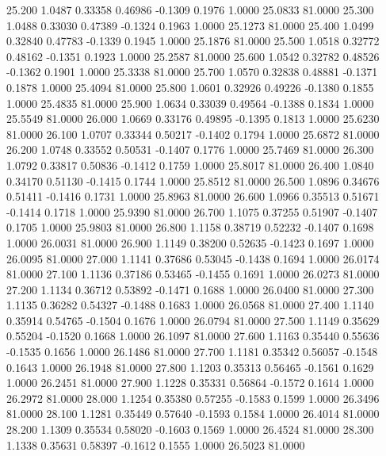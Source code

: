   25.200   1.0487   0.33358   0.46986  -0.1309   0.1976   1.0000  25.0833  81.0000
  25.300   1.0488   0.33030   0.47389  -0.1324   0.1963   1.0000  25.1273  81.0000
  25.400   1.0499   0.32840   0.47783  -0.1339   0.1945   1.0000  25.1876  81.0000
  25.500   1.0518   0.32772   0.48162  -0.1351   0.1923   1.0000  25.2587  81.0000
  25.600   1.0542   0.32782   0.48526  -0.1362   0.1901   1.0000  25.3338  81.0000
  25.700   1.0570   0.32838   0.48881  -0.1371   0.1878   1.0000  25.4094  81.0000
  25.800   1.0601   0.32926   0.49226  -0.1380   0.1855   1.0000  25.4835  81.0000
  25.900   1.0634   0.33039   0.49564  -0.1388   0.1834   1.0000  25.5549  81.0000
  26.000   1.0669   0.33176   0.49895  -0.1395   0.1813   1.0000  25.6230  81.0000
  26.100   1.0707   0.33344   0.50217  -0.1402   0.1794   1.0000  25.6872  81.0000
  26.200   1.0748   0.33552   0.50531  -0.1407   0.1776   1.0000  25.7469  81.0000
  26.300   1.0792   0.33817   0.50836  -0.1412   0.1759   1.0000  25.8017  81.0000
  26.400   1.0840   0.34170   0.51130  -0.1415   0.1744   1.0000  25.8512  81.0000
  26.500   1.0896   0.34676   0.51411  -0.1416   0.1731   1.0000  25.8963  81.0000
  26.600   1.0966   0.35513   0.51671  -0.1414   0.1718   1.0000  25.9390  81.0000
  26.700   1.1075   0.37255   0.51907  -0.1407   0.1705   1.0000  25.9803  81.0000
  26.800   1.1158   0.38719   0.52232  -0.1407   0.1698   1.0000  26.0031  81.0000
  26.900   1.1149   0.38200   0.52635  -0.1423   0.1697   1.0000  26.0095  81.0000
  27.000   1.1141   0.37686   0.53045  -0.1438   0.1694   1.0000  26.0174  81.0000
  27.100   1.1136   0.37186   0.53465  -0.1455   0.1691   1.0000  26.0273  81.0000
  27.200   1.1134   0.36712   0.53892  -0.1471   0.1688   1.0000  26.0400  81.0000
  27.300   1.1135   0.36282   0.54327  -0.1488   0.1683   1.0000  26.0568  81.0000
  27.400   1.1140   0.35914   0.54765  -0.1504   0.1676   1.0000  26.0794  81.0000
  27.500   1.1149   0.35629   0.55204  -0.1520   0.1668   1.0000  26.1097  81.0000
  27.600   1.1163   0.35440   0.55636  -0.1535   0.1656   1.0000  26.1486  81.0000
  27.700   1.1181   0.35342   0.56057  -0.1548   0.1643   1.0000  26.1948  81.0000
  27.800   1.1203   0.35313   0.56465  -0.1561   0.1629   1.0000  26.2451  81.0000
  27.900   1.1228   0.35331   0.56864  -0.1572   0.1614   1.0000  26.2972  81.0000
  28.000   1.1254   0.35380   0.57255  -0.1583   0.1599   1.0000  26.3496  81.0000
  28.100   1.1281   0.35449   0.57640  -0.1593   0.1584   1.0000  26.4014  81.0000
  28.200   1.1309   0.35534   0.58020  -0.1603   0.1569   1.0000  26.4524  81.0000
  28.300   1.1338   0.35631   0.58397  -0.1612   0.1555   1.0000  26.5023  81.0000
